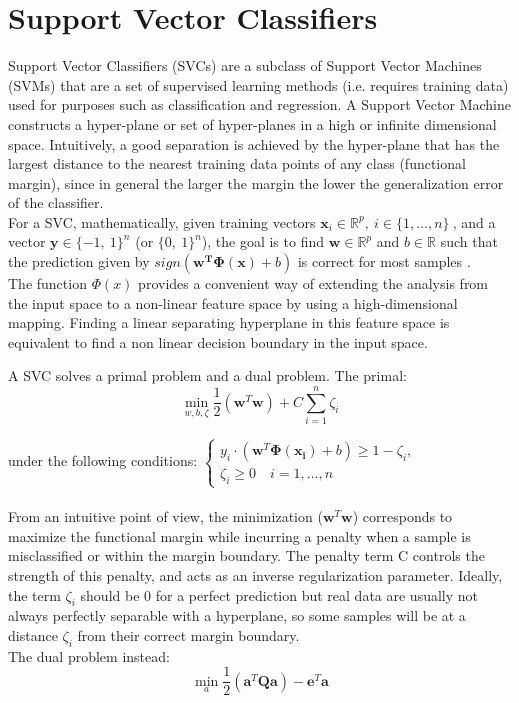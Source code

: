 \documentclass{standalone}
\begin{document}
\section{Support Vector Classifiers}

Support Vector Classifiers (SVCs) are a subclass of Support Vector Machines (SVMs) that are a set of supervised learning methods (i.e. requires training data) used for purposes such as classification and regression.
A Support Vector Machine constructs a hyper-plane or set of hyper-planes in a high or infinite dimensional space.
Intuitively, a good separation is achieved by the hyper-plane that has the largest distance to the nearest training data points of any class (functional margin), since in general the larger the margin the lower the generalization error of the classifier\cite{SVCscikit, Bishop}.\\
For a SVC, mathematically, given training vectors $ \mathbf{x}_i \in \mathbb{R}^p ,  \: i \in \{1,\dots, n\} \:$, and a vector $\mathbf{y} \in \{ -1, \: 1 \}^n$ (or $ \{0, \: 1 \}^n$), the goal is to find $\mathbf{w} \in \mathbb{R}^p$ and $b \in \mathbb{R}$ such that the prediction given by $sign(\mathbf{w^T  \mathbf{\Phi(x)}} + b)$ is correct for most samples \cite{SVCscikit}.\\
The function $\Phi(x)$ provides a convenient way of extending the analysis from the input space to a non-linear feature space by using a high-dimensional mapping. 
Finding a linear separating hyperplane in this feature space is equivalent to find a non linear decision boundary in the input space\cite{SVCmapping}.

A SVC solves a primal problem and a dual problem. 
The primal:
\begin{equation}
    \min_{w, b, \zeta} \frac{1}{2} (\mathbf{w}^T  \mathbf{w}) + C \sum_{i = 1}^{n} \zeta_i
\end{equation}

under the following conditions: $\begin{cases}
    y_i \cdot (\mathbf{w}^T  \mathbf{\Phi(x_i)} + b)  \geq 1 - \zeta_i, \\
    \zeta_i \geq 0 \quad i = 1, \dots, n 
    \end{cases}$
\newline
\\
\\
From an intuitive point of view, the minimization ($\mathbf{w}^T  \mathbf{w}$) corresponds to maximize the functional margin while incurring a penalty when a sample is misclassified or within the margin boundary.
The penalty term C controls the strength of this penalty, and acts as an inverse regularization parameter\cite{SVCscikit}.
Ideally, the term $\zeta_i$ should be 0 for a perfect prediction but real data are usually not always perfectly separable with a hyperplane, so some samples will be at a distance $\zeta_i$ from their correct margin boundary.
\\
The dual problem instead:
\begin{equation}
    \min_{a} \frac{1}{2} (\mathbf{a}^T \mathbf{Q} \mathbf{a}) - \mathbf{e}^T \mathbf{a}
\end{equation}
\end{document}
